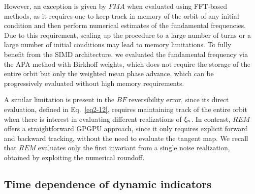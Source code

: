 \begin{chapterappendices}
However, an exception is given by $FMA$ when evaluated using FFT-based methods, as it requires one to keep track in memory of the orbit of any initial condition and then perform numerical estimates of the fundamental frequencies. Due to this requirement, scaling up the procedure to a large number of turns or a large number of initial conditions may lead to memory limitations. To fully benefit from the SIMD architecture, we evaluated the fundamental frequency via the APA method with Birkhoff weights, which does not require the storage of the entire orbit but only the weighted mean phase advance, which can be progressively evaluated without high memory requirements.

A similar limitation is present in the $BF$ reversibility error, since its direct evaluation, defined in Eq.~\eqref{eq2-12}, requires maintaining track of the entire orbit when there is interest in evaluating different realizations of $\vb{\xi}_n$. In contrast, $REM$ offers a straightforward GPGPU approach, since it only requires explicit forward and backward tracking, without the need to evaluate the tangent map. We recall that $REM$ evaluates only the first invariant from a single noise realization, obtained by exploiting the numerical roundoff.
%
\subsection{Time dependence of dynamic indicators\label{app:timedep}}



\end{chapterappendices}
